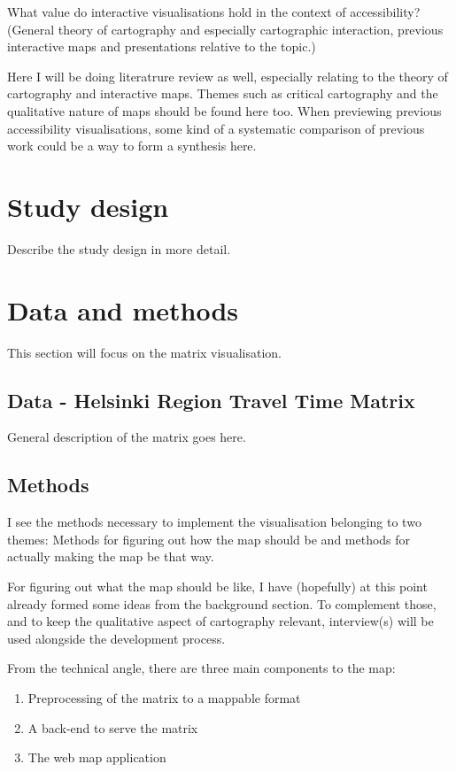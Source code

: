 \documentclass[12pt]{article}
\begin{document}
\begin{displayquote}
What value do interactive visualisations hold in the context of accessibility?
(General theory of cartography and especially cartographic interaction,
previous interactive maps and presentations relative to the topic.)
\end{displayquote}

Here I will be doing literatrure review as well,
especially relating to the theory of cartography and interactive maps.
Themes such as critical cartography
and the qualitative nature of maps should be found here too.
When previewing previous accessibility visualisations,
some kind of a systematic comparison of previous work
could be a way to form a synthesis here.

\section{Study design}
Describe the study design in more detail.

\section{Data and methods}

This section will focus on the matrix visualisation.

\subsection{Data - Helsinki Region Travel Time Matrix}

General description of the matrix goes here.

\subsection{Methods}

I see the methods necessary to implement the visualisation belonging to two themes:
Methods for figuring out how the map should be
and methods for actually making the map be that way.

For figuring out what the map should be like,
I have (hopefully) at this point already formed some ideas from the background section.
To complement those, and to keep the qualitative aspect of cartography relevant,
interview(s) will be used alongside the development process.

From the technical angle, there are three main components to the map:

\begin{enumerate}
	\item Preprocessing of the matrix to a mappable format
	\item A back-end to serve the matrix
	\item The web map application
\end{enumerate}
\end{document}
